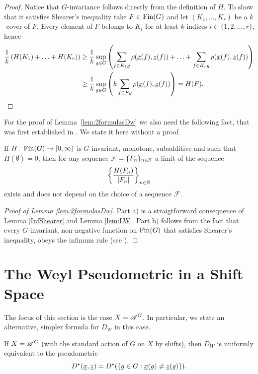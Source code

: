 \begin{proof}Notice that $G$-invariance follows directly from the definition of $H$. To show that it satisfies Shearer's inequality take $F\in\operatorname{Fin}(G)$ and let $(K_1,\ldots,K_r)$ be a $k$-cover of $F$. Every element of $F$ belongs to $K_i$ for at least $k$ indices $i\in\{1,2,\ldots,r\}$, hence
\begin{align*}
{1\over k}\inparen{H(K_1)+\ldots +H(K_r)} &\geq \frac{1}{k} \sup_{g\in G}\inparen{\sum_{f\in K_1g} \rho (\und{x}(f),\und{z}(f))+\ldots+\sum_{f\in K_rg} \rho (\und{x}(f),\und{z}(f))}
\\
&\geq   \frac{1}{k}\sup_{g\in G}\inparen{k \sum_{f\in Fg} \rho (\und{x}(f),\und{z}(f))} %
= H(F). \qedhere
\end{align*}
\end{proof}
\noindent 
For the proof of Lemma~\ref{lem:2formulasDw} we also need the following fact, that was first established in \cite{LW00}. We state it here without a proof.
\begin{lem}[{\cite[Theorem 6.1]{LW00}}]\label{lem:LW}
If $H\colon\operatorname{Fin}(G)\to[0,\infty)$ is $G$-invariant, monotone, subadditive and such that $H(\emptyset)=0$, then for any \Folner sequence $\mathcal F=\{F_n\}_{n\in\mathbb{N}}$ a limit of the sequence
\[
\left\{\frac{H(F_n)}{|F_n|}\right\}_{n\in\mathbb{N}}
\]
exists and does not depend on the choice of a \Folner sequence $\mathcal F$.
\end{lem}

\begin{proof}[Proof of Lemma \ref{lem:2formulasDw}]
Part a) is a straigtforward consequence of Lemma \ref{InfShearer} and Lemma \ref{lem:LW}. 
Part b) follows from the fact that every $G$-invariant, non-negative function on $\operatorname{Fin}(G)$ that satisfies Shearer's inequality, obeys the infimum rule (see \cite[Proposition 3.3]{DFR16}).
\end{proof}


\section{The Weyl Pseudometric in a Shift Space}
The focus of this section is the case $X=\mathscr{A}^G$. In particular, we state an alternative, simpler formula for $D_W$ in this case.

\begin{thm}\label{thm:shift_equiv_weyl}
If $X=\mathscr{A}^G$ (with the standard action of $G$ on $X$ by shifts), then $D_W$  is uniformly equivalent to the pseudometric
\[
D^\star(\underline{x},\underline{z})=D^\star(\{g\in G : \underline{x}(g)\neq \underline{z}(g)\}).
\]
\end{thm}

